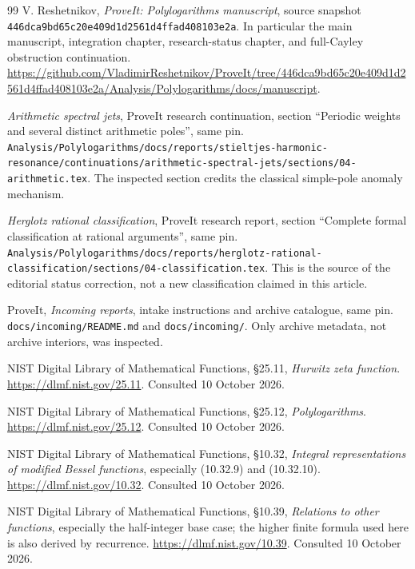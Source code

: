 \documentclass[11pt,letterpaper]{article}
\numberwithin{equation}{section}
\theoremstyle{definition}
\newcommand{\qfile}[1]{\nolinkurl{#1}}
\newcommand{\qpin}{\nolinkurl{446dca9bd65c20e409d1d2561d4ffad408103e2a}}
\begin{document}

\begin{thebibliography}{99}
V. Reshetnikov, \emph{ProveIt: Polylogarithms manuscript}, source snapshot
\qpin. In particular the main manuscript, integration chapter,
research-status chapter, and full-Cayley obstruction continuation.
\url{https://github.com/VladimirReshetnikov/ProveIt/tree/446dca9bd65c20e409d1d2561d4ffad408103e2a/Analysis/Polylogarithms/docs/manuscript}.

\emph{Arithmetic spectral jets}, ProveIt research continuation,
section ``Periodic weights and several distinct arithmetic poles'', same pin.
\qfile{Analysis/Polylogarithms/docs/reports/stieltjes-harmonic-resonance/continuations/arithmetic-spectral-jets/sections/04-arithmetic.tex}.
The inspected section credits the classical simple-pole anomaly mechanism.

\emph{Herglotz rational classification}, ProveIt research report,
section ``Complete formal classification at rational arguments'', same pin.
\qfile{Analysis/Polylogarithms/docs/reports/herglotz-rational-classification/sections/04-classification.tex}.
This is the source of the editorial status correction, not a new
classification claimed in this article.

ProveIt, \emph{Incoming reports}, intake instructions and archive catalogue,
same pin. \qfile{docs/incoming/README.md} and \qfile{docs/incoming/}.
Only archive metadata, not archive interiors, was inspected.

NIST Digital Library of Mathematical Functions, \S25.11,
\emph{Hurwitz zeta function}.
\url{https://dlmf.nist.gov/25.11}. Consulted 10 October 2026.

NIST Digital Library of Mathematical Functions, \S25.12,
\emph{Polylogarithms}.
\url{https://dlmf.nist.gov/25.12}. Consulted 10 October 2026.

NIST Digital Library of Mathematical Functions, \S10.32,
\emph{Integral representations of modified Bessel functions}, especially
(10.32.9) and (10.32.10).
\url{https://dlmf.nist.gov/10.32}. Consulted 10 October 2026.

NIST Digital Library of Mathematical Functions, \S10.39,
\emph{Relations to other functions}, especially the half-integer base case;
the higher finite formula used here is also derived by recurrence.
\url{https://dlmf.nist.gov/10.39}. Consulted 10 October 2026.


\end{thebibliography}
\end{document}
